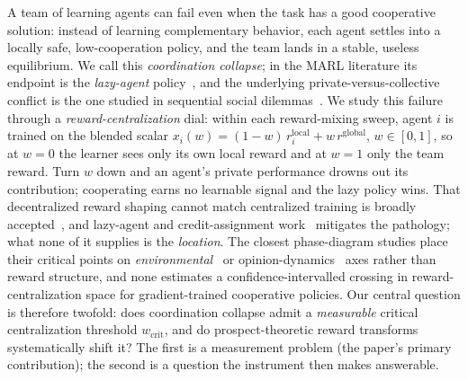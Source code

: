 \documentclass[letterpaper]{article} %
\theoremstyle{plain}
\newcommand{\wcrit}{w_{\mathrm{crit}}}
\begin{document}
A team of learning agents can fail even when the task has a good cooperative solution: instead of
learning complementary behavior, each agent settles into a locally safe, low-cooperation policy,
and the team lands in a stable, useless equilibrium. We call this \emph{coordination collapse};
in the MARL literature its endpoint is the \emph{lazy-agent}
policy~\citep{liu2023lazy,peng2023curo}, and the underlying private-versus-collective conflict is
the one studied in sequential social dilemmas~\citep{leibo2017multi}. We study this failure through
a \emph{reward-centralization} dial: within each reward-mixing sweep, agent $i$ is trained on the
blended scalar $x_i(w)=(1-w)\,r_i^{\mathrm{local}}+w\,r^{\mathrm{global}}$, $w\in[0,1]$, so at
$w{=}0$ the learner sees only its own local reward and at $w{=}1$ only the team reward. Turn $w$
down and an agent's private performance drowns out its contribution; cooperating earns no
learnable signal and the lazy policy wins. That decentralized reward shaping cannot match
centralized training is broadly accepted~\citep{dmarl2025}, and lazy-agent and credit-assignment
work~\citep{liu2023lazy,peng2023curo,sunehag2018vdn,rashid2018qmix,foerster2018counterfactual}
mitigates the pathology; what none of it supplies is the \emph{location}. The closest phase-diagram
studies place their critical points on \emph{environmental}~\citep{yamaguchi2025} or
opinion-dynamics~\citep{capannoli2026phase} axes rather than reward structure, and none estimates a
confidence-intervalled crossing in reward-centralization space for gradient-trained cooperative
policies. Our central question is therefore twofold: does coordination collapse admit a
\emph{measurable} critical centralization threshold $\wcrit$, and do prospect-theoretic reward
transforms systematically shift it? The first is a measurement problem (the paper's primary
contribution); the second is a question the instrument then makes answerable.
\end{document}
